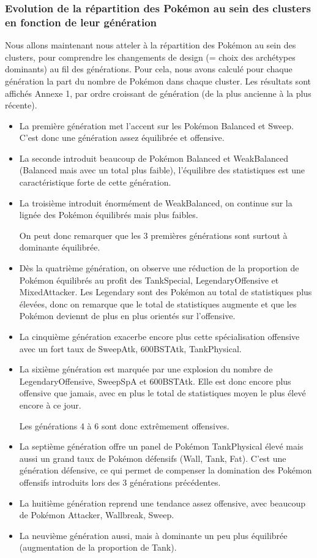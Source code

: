 \documentclass[a4paper,12pt]{article}
\begin{document}
\subsubsection{Evolution de la répartition des Pokémon au sein des clusters en fonction de leur génération}

Nous allons maintenant nous atteler à la répartition des Pokémon au sein des clusters, pour comprendre les changements de design (= choix des archétypes dominants) au fil des générations.
Pour cela, nous avons calculé pour chaque génération la part du nombre de Pokémon dans chaque cluster. Les résultats sont affichés Annexe 1, par ordre croissant de génération (de la plus ancienne à la plus récente).



\begin{itemize}
    \item La première génération met l'accent sur les Pokémon Balanced et Sweep. C'est donc une génération assez équilibrée et offensive.
    \item La seconde introduit beaucoup de Pokémon Balanced et WeakBalanced (Balanced mais avec un total plus faible), l'équilibre des statistiques est une caractéristique forte de cette génération.
    \item La troisième introduit énormément de WeakBalanced, on continue sur la lignée des Pokémon équilibrés mais plus faibles.
    
On peut donc remarquer que les 3 premières générations sont surtout à dominante équilibrée.
    \item Dès la quatrième génération, on observe une réduction de la proportion de Pokémon équilibrés au profit des TankSpecial, LegendaryOffensive et MixedAttacker. Les Legendary sont des Pokémon au total de statistiques plus élevées, donc on remarque que le total de statistiques augmente et que les Pokémon deviennt de plus en plus orientés sur l'offensive.
    \item La cinquième génération exacerbe encore plus cette spécialisation offensive avec un fort taux de SweepAtk, 600BSTAtk, TankPhysical.
    \item La sixième génération est marquée par une explosion du nombre de LegendaryOffensive, SweepSpA et 600BSTAtk. Elle est donc encore plus offensive que jamais, avec en plus le total de statistiques moyen le plus élevé encore à ce jour.

Les générations 4 à 6 sont donc extrêmement offensives.
    \item La septième génération offre un panel de Pokémon TankPhysical élevé mais aussi un grand taux de Pokémon défensifs (Wall, Tank, Fat). C'est une génération défensive, ce qui permet de compenser la domination des Pokémon offensifs introduits lors des 3 générations précédentes.
    \item La huitième génération reprend une tendance assez offensive, avec beaucoup de Pokémon Attacker, Wallbreak, Sweep.
    \item La neuvième génération aussi, mais à dominante un peu plus équilibrée (augmentation de la proportion de Tank).
\end{itemize}
\end{document}
